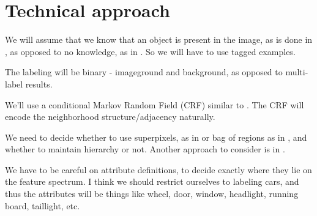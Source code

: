 \documentclass[10pt,twocolumn,letterpaper]{article}
\begin{document}
\section{Technical approach}
We will assume that we know that an object is present in the image, as is done in \cite{borenstein04}, as opposed to no knowledge, as in \cite{shotton06}.  So we will have to use tagged examples.

The labeling will be binary - imageground and background, as opposed to multi-label results.

We'll use a conditional Markov Random Field (CRF) similar to \cite{gould08}.  The CRF will encode the neighborhood structure/adjacency naturally.

We need to decide whether to use superpixels, as in \cite{gould08} or bag of regions as in \cite{gu09, russell06}, and whether to maintain hierarchy or not.  Another approach to consider is in \cite{hoiem05}.

We have to be careful on attribute definitions, to decide exactly where they lie on the feature spectrum.  I think we should restrict ourselves to labeling cars, and thus the attributes will be things like wheel, door, window, headlight, running board, taillight, etc.
\end{document}
